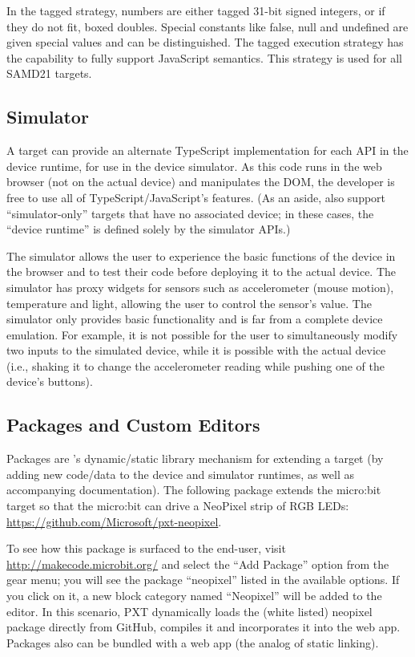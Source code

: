 In the tagged strategy, numbers are either tagged 31-bit signed integers, or if they do not fit, 
boxed doubles. Special constants like false, null and undefined are given special values 
and can be distinguished. The tagged execution strategy has the capability to fully support
JavaScript semantics. This strategy is used for all SAMD21 targets.

\subsection{Simulator}

A \MC target can provide an alternate TypeScript implementation for each API in the device runtime, for use in the device
simulator. As this code runs in the web browser (not on the actual device) and manipulates the DOM, the developer is free to
use all of TypeScript/JavaScript's features. (As an aside, \MC also support ``simulator-only'' targets that have no 
associated device; in these cases, the ``device runtime'' is defined solely by the simulator APIs.) 

The simulator allows the user to experience the basic functions of the device in the browser and to test their code
before deploying it to the actual device. The simulator has proxy widgets for sensors such as accelerometer (mouse motion),
temperature and light, allowing the user to control the sensor's value.  The simulator only provides basic functionality
and is far from a complete device emulation.   For example, it is not possible for the user to simultaneously modify two
inputs to the simulated device, while it is possible with the actual device (i.e., shaking it to change the accelerometer
reading while pushing one of the device's buttons).


\subsection{Packages and Custom Editors}

Packages are \MCN's dynamic/static library mechanism for extending a target (by adding new code/data to the device
and simulator runtimes, as well as accompanying documentation). The following package extends the micro:bit target so
that the micro:bit can drive a NeoPixel strip of RGB LEDs: \url{https://github.com/Microsoft/pxt-neopixel}. 

To see how this
package is surfaced to the end-user, visit \url{http://makecode.microbit.org/} and select the ``Add Package'' option from the
gear menu; you will see the package ``neopixel'' listed in the available options. If you click on it, a new block category
named ``Neopixel'' will be added to the editor. In this scenario, PXT dynamically loads the (white listed) neopixel 
package directly from GitHub, compiles it and incorporates it into the web app. Packages also can be bundled with a web
app (the analog of static linking).  

